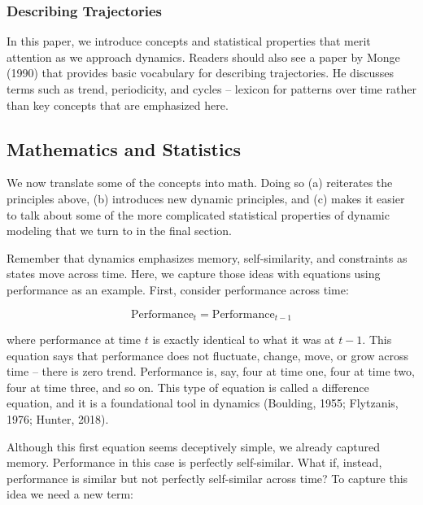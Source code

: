 \documentclass[english,,man]{apa6}
\begin{document}
\hypertarget{describing-trajectories}{%
\subsubsection{Describing Trajectories}\label{describing-trajectories}}

In this paper, we introduce concepts and statistical properties that merit attention as we approach dynamics. Readers should also see a paper by Monge (1990) that provides basic vocabulary for describing trajectories. He discusses terms such as trend, periodicity, and cycles -- lexicon for patterns over time rather than key concepts that are emphasized here.

\hypertarget{mathematics-and-statistics}{%
\subsection{Mathematics and Statistics}\label{mathematics-and-statistics}}

We now translate some of the concepts into math. Doing so (a) reiterates the principles above, (b) introduces new dynamic principles, and (c) makes it easier to talk about some of the more complicated statistical properties of dynamic modeling that we turn to in the final section.

Remember that dynamics emphasizes memory, self-similarity, and constraints as states move across time. Here, we capture those ideas with equations using performance as an example. First, consider performance across time:

\begin{equation}
\textrm{Performance}_{t} = \textrm{Performance}_{t-1}
\end{equation}

\noindent where performance at time \(t\) is exactly identical to what it was at \(t-1\). This equation says that performance does not fluctuate, change, move, or grow across time -- there is zero trend. Performance is, say, four at time one, four at time two, four at time three, and so on. This type of equation is called a difference equation, and it is a foundational tool in dynamics (Boulding, 1955; Flytzanis, 1976; Hunter, 2018).

Although this first equation seems deceptively simple, we already captured memory. Performance in this case is perfectly self-similar. What if, instead, performance is similar but not perfectly self-similar across time? To capture this idea we need a new term:
\end{document}
